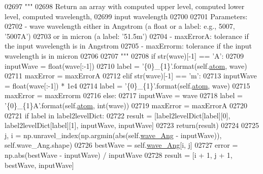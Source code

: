 \begin{DoxyCode}
{{{{{{{{{{{{{{{{{{{{{{02697         \textcolor{stringliteral}{"""}
02698 \textcolor{stringliteral}{        Return an array with computed upper level, computed lower level, computed wavelength, }
02699 \textcolor{stringliteral}{            input wavelength}
02700 \textcolor{stringliteral}{        }
02701 \textcolor{stringliteral}{        Parameters:}
02702 \textcolor{stringliteral}{            - wave       wavelength either in Angstrom (a float or a label: e.g., 5007, '5007A') }
02703 \textcolor{stringliteral}{                            or in micron (a label: '51.5m')}
02704 \textcolor{stringliteral}{            - maxErrorA: tolerance if the input wavelength is in Angstrom}
02705 \textcolor{stringliteral}{            - maxErrorm: tolerance if the input wavelength is in micron}
02706 \textcolor{stringliteral}{                            }
02707 \textcolor{stringliteral}{        """}
02708         \textcolor{keywordflow}{if} str(wave)[-1] == \textcolor{stringliteral}{'A'}:
02709             inputWave = float(wave[:-1])
02710             label = \textcolor{stringliteral}{'\{0\}\_\{1\}'}.format(self.\hyperlink{classpyneb_1_1core_1_1pynebcore_1_1_rec_atom_a1a2aa175da6b5b8847f409e37437e3d3}{atom}, wave)
02711             maxError = maxErrorA
02712         \textcolor{keywordflow}{elif} str(wave)[-1] == \textcolor{stringliteral}{'m'}:
02713             inputWave = float(wave[:-1]) * 1e4
02714             label = \textcolor{stringliteral}{'\{0\}\_\{1\}'}.format(self.\hyperlink{classpyneb_1_1core_1_1pynebcore_1_1_rec_atom_a1a2aa175da6b5b8847f409e37437e3d3}{atom}, wave)
02715             maxError = maxErrorm
02716         \textcolor{keywordflow}{else}:
02717             inputWave = wave
02718             label = \textcolor{stringliteral}{'\{0\}\_\{1\}A'}.format(self.\hyperlink{classpyneb_1_1core_1_1pynebcore_1_1_rec_atom_a1a2aa175da6b5b8847f409e37437e3d3}{atom}, int(wave))
02719             maxError = maxErrorA
02720             
02721         \textcolor{keywordflow}{if} label \textcolor{keywordflow}{in} label2levelDict:
02722             result = [label2levelDict[label][0], label2levelDict[label][1], inputWave, inputWave]
02723             return(result)
02724         
02725         j, i = np.unravel\_index(np.argmin(abs(self.\hyperlink{classpyneb_1_1core_1_1pynebcore_1_1_rec_atom_aa2fd61021ea3067af77e7ee0053ace11}{wave\_Ang} - inputWave)), self.wave\_Ang.shape)
02726         bestWave = self.\hyperlink{classpyneb_1_1core_1_1pynebcore_1_1_rec_atom_aa2fd61021ea3067af77e7ee0053ace11}{wave\_Ang}[i, j]
02727         error = np.abs(bestWave - inputWave) / inputWave
02728         result = [i + 1, j + 1, bestWave, inputWave]
}}}}}}}}}}}}}}}}}}}}}}
\end{DoxyCode}
